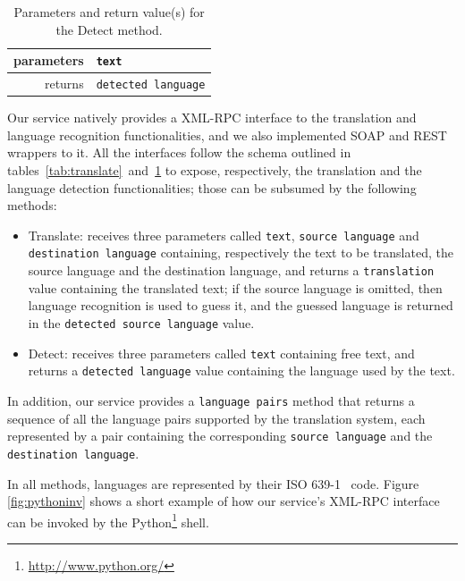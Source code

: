 \documentclass[11pt]{article}
\begin{document}
\begin{table}[!ht]
\begin{center}
 \begin{tabular}{|r|l|}
  \hline
   parameters	& {\tt\small text} \\
  \hline \hline
   returns 	& {\tt\small detected language}\\
  \hline
 \end{tabular}
\end{center}
\caption{Parameters and return value(s) for the Detect method.}
\label{tab:detect}
\end{table}

Our service natively provides a XML-RPC interface to the translation and language recognition functionalities, and we also implemented SOAP and REST wrappers to it. All the interfaces follow the schema outlined in tables~\ref{tab:translate}~and~\ref{tab:detect} to expose, respectively, the translation and the language detection functionalities; those can be subsumed by the following methods:

\begin{itemize}
 \item Translate: receives three parameters called {\tt\small text}, {\tt\small source language} and {\tt\small destination language} containing, respectively the text to be translated, the source language and the destination language, and returns a {\tt\small translation} value containing the translated text; if the source language is omitted, then language recognition is used to guess it, and the guessed language is returned in the {\tt\small detected source language} value.
 \item Detect: receives three parameters called {\tt\small text} containing free text, and returns a {\tt\small detected language} value containing the language used by the text.
\end{itemize}

In addition, our service provides a {\tt\small language pairs} method that returns a sequence of all the language pairs supported by the translation system, each represented by a pair containing the corresponding {\tt\small source language} and the {\tt\small destination language}.


In all methods, languages are represented by their ISO 639-1~\citep{ISO:639-1} code. Figure \ref{fig:pythoninv} shows a short example of how our service's XML-RPC interface can be invoked by the Python\footnote{\url{http://www.python.org/}} shell.
\end{document}
